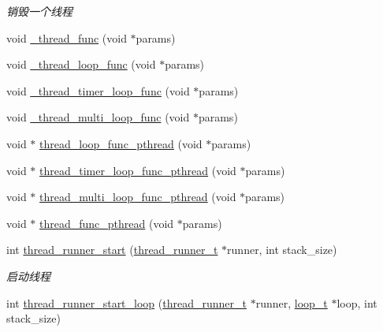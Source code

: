 \begin{DoxyCompactItemize}
\begin{DoxyCompactList}\small\item\em 销毁一个线程 \end{DoxyCompactList}\item 
void \hyperlink{a00082_ae1217c770962ea59a20fa931ad6fee0c_ae1217c770962ea59a20fa931ad6fee0c}{\+\_\+thread\+\_\+func} (void $\ast$params)
\item 
void \hyperlink{a00082_ad2578ccaa4c6ce7670eabd9575204c38_ad2578ccaa4c6ce7670eabd9575204c38}{\+\_\+thread\+\_\+loop\+\_\+func} (void $\ast$params)
\item 
void \hyperlink{a00082_af3540c31c89a280433080939f96da861_af3540c31c89a280433080939f96da861}{\+\_\+thread\+\_\+timer\+\_\+loop\+\_\+func} (void $\ast$params)
\item 
void \hyperlink{a00082_af85e5a51f4ff2866c5db552529646165_af85e5a51f4ff2866c5db552529646165}{\+\_\+thread\+\_\+multi\+\_\+loop\+\_\+func} (void $\ast$params)
\item 
void $\ast$ \hyperlink{a00082_a4f94afc82ab1358bdfdaa1739ca71655_a4f94afc82ab1358bdfdaa1739ca71655}{thread\+\_\+loop\+\_\+func\+\_\+pthread} (void $\ast$params)
\item 
void $\ast$ \hyperlink{a00082_a878593e36d665dc3334cf71e88bf93e6_a878593e36d665dc3334cf71e88bf93e6}{thread\+\_\+timer\+\_\+loop\+\_\+func\+\_\+pthread} (void $\ast$params)
\item 
void $\ast$ \hyperlink{a00082_acd0090cfcdc1ccc4cc778a0a70d20e57_acd0090cfcdc1ccc4cc778a0a70d20e57}{thread\+\_\+multi\+\_\+loop\+\_\+func\+\_\+pthread} (void $\ast$params)
\item 
void $\ast$ \hyperlink{a00082_a75b9d7e4a1d3734e2a4c0ba298b1578c_a75b9d7e4a1d3734e2a4c0ba298b1578c}{thread\+\_\+func\+\_\+pthread} (void $\ast$params)
\item 
int \hyperlink{a00109_ga1114fd962e310f9d31ed4e83d8a21897_ga1114fd962e310f9d31ed4e83d8a21897}{thread\+\_\+runner\+\_\+start} (\hyperlink{a00051_a9054159cde2f926ef61c28ce1e555199_a9054159cde2f926ef61c28ce1e555199}{thread\+\_\+runner\+\_\+t} $\ast$runner, int stack\+\_\+size)
\begin{DoxyCompactList}\small\item\em 启动线程 \end{DoxyCompactList}\item 
int \hyperlink{a00109_ga93f88ba77e7eab786da6fe7d1f681a2e_ga93f88ba77e7eab786da6fe7d1f681a2e}{thread\+\_\+runner\+\_\+start\+\_\+loop} (\hyperlink{a00051_a9054159cde2f926ef61c28ce1e555199_a9054159cde2f926ef61c28ce1e555199}{thread\+\_\+runner\+\_\+t} $\ast$runner, \hyperlink{a00051_a9c3ad1cd2de83e09f3a7b59fa82c94ee_a9c3ad1cd2de83e09f3a7b59fa82c94ee}{loop\+\_\+t} $\ast$loop, int stack\+\_\+size)

\end{DoxyCompactItemize}
